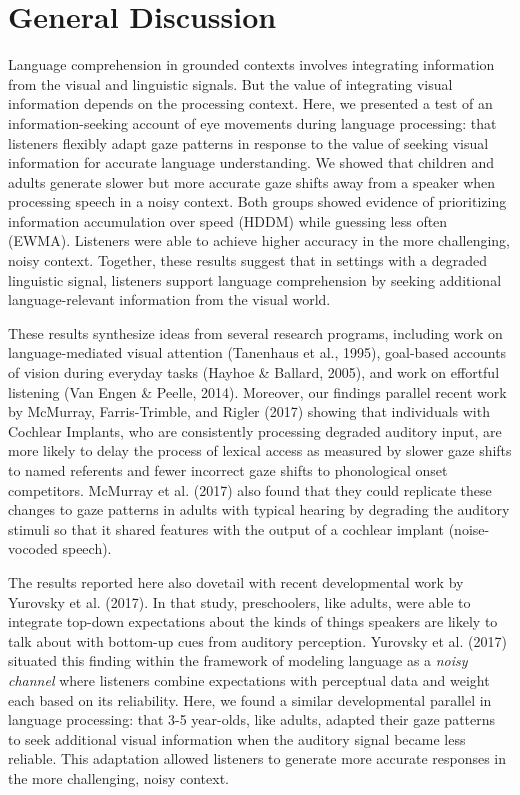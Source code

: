 \documentclass[english,floatsintext,man]{apa6}
\begin{document}
\hypertarget{general-discussion}{%
\section{General Discussion}\label{general-discussion}}

Language comprehension in grounded contexts involves integrating
information from the visual and linguistic signals. But the value of
integrating visual information depends on the processing context. Here,
we presented a test of an information-seeking account of eye movements
during language processing: that listeners flexibly adapt gaze patterns
in response to the value of seeking visual information for accurate
language understanding. We showed that children and adults generate
slower but more accurate gaze shifts away from a speaker when processing
speech in a noisy context. Both groups showed evidence of prioritizing
information accumulation over speed (HDDM) while guessing less often
(EWMA). Listeners were able to achieve higher accuracy in the more
challenging, noisy context. Together, these results suggest that in
settings with a degraded linguistic signal, listeners support language
comprehension by seeking additional language-relevant information from
the visual world.

These results synthesize ideas from several research programs, including
work on language-mediated visual attention (Tanenhaus et al., 1995),
goal-based accounts of vision during everyday tasks (Hayhoe \& Ballard,
2005), and work on effortful listening (Van Engen \& Peelle, 2014).
Moreover, our findings parallel recent work by McMurray, Farris-Trimble,
and Rigler (2017) showing that individuals with Cochlear Implants, who
are consistently processing degraded auditory input, are more likely to
delay the process of lexical access as measured by slower gaze shifts to
named referents and fewer incorrect gaze shifts to phonological onset
competitors. McMurray et al. (2017) also found that they could replicate
these changes to gaze patterns in adults with typical hearing by
degrading the auditory stimuli so that it shared features with the
output of a cochlear implant (noise-vocoded speech).

The results reported here also dovetail with recent developmental work
by Yurovsky et al. (2017). In that study, preschoolers, like adults,
were able to integrate top-down expectations about the kinds of things
speakers are likely to talk about with bottom-up cues from auditory
perception. Yurovsky et al. (2017) situated this finding within the
framework of modeling language as a \emph{noisy channel} where listeners
combine expectations with perceptual data and weight each based on its
reliability. Here, we found a similar developmental parallel in language
processing: that 3-5 year-olds, like adults, adapted their gaze patterns
to seek additional visual information when the auditory signal became
less reliable. This adaptation allowed listeners to generate more
accurate responses in the more challenging, noisy context.
\end{document}
